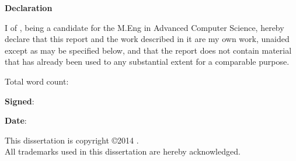 \newpage
{\Huge \bf Declaration}

\vspace{24pt} 

I \authorname of \authorcollege, being a candidate for the M.Eng in
Advanced Computer Science, hereby declare that this report and the
work described in it are my own work, unaided except as may be
specified below, and that the report does not contain material that
has already been used to any substantial extent for a comparable
purpose.

\vspace{24pt}
Total word count: \wordcount

\vspace{60pt}
\textbf{Signed}: 

\vspace{12pt}
\textbf{Date}:


\vfill

This dissertation is copyright \copyright 2014 \authorname. 
\\
All trademarks used in this dissertation are hereby acknowledged.



\newpage
\vspace*{\fill}
